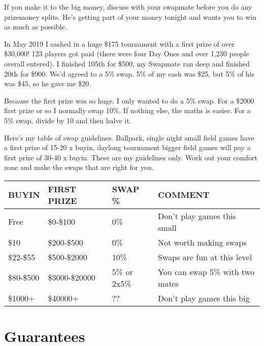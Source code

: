 If you make it to the big money, discuss with your swapmate before you
do any prizemoney splits. He's getting part of your money tonight and
wants you to win as much as possible.

In May 2019 I cashed in a huge \$175 tournament with a first
prize of over \$30,000! 123 players got paid (there were four Day Ones
and over 1,230 people overall entered). I finished 105th for \$500, my
Swapmate ran deep and finished 20th for \$900. We'd agreed to a 5\% swap.
5\% of my cash was \$25, but 5\% of his was \$45, so he gave me \$20.

Because the first prize was so huge, I only wanted to do a 5\% swap.
For a \$2000 first prize or so I normally swap 10\%. If nothing else,
the maths is easier. For a 5\% swap, divide by 10 and then halve it.

Here's my table of swap guidelines. Ballpark, single night small field
games have a first prize of 15-20 x buyin, daylong tournament bigger
field games will pay a first prize of 30-40 x buyin.
These are my guidelines only. Work out your comfort zone and make the
swaps that are right for you.

\begin{tabular}{|l|l|l|l|} \hline
BUYIN & FIRST PRIZE & SWAP \% & COMMENT\\ \hline
Free  & \$0-\$100 & 0\% & Don't play games this small \\ \hline
\$10  & \$200-\$500 & 0\%  & Not worth making swaps \\ \hline
\$22-\$55 & \$500-\$2000 & 10\% & Swaps are fun at this level \\ \hline
\$80-\$500 & \$3000-\$20000 & 5\% or 2x5\% & You can swap 5\% with two mates \\ \hline
\$1000+ & \$40000+ & ?? & Don't play games this big \\ \hline
\end{tabular}

\section{Guarantees}

